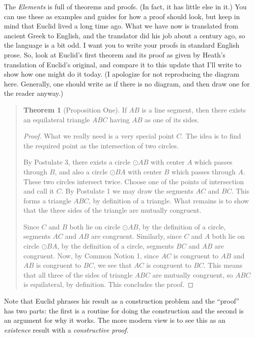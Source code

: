 \documentclass{tufte-handout}
\theoremstyle{definition}
\newtheorem*{theorem}{Theorem}
\begin{document}
The \emph{Elements} is full of theorems and proofs. (In fact, it has little else in it.) You can use these as examples and guides for how a proof should look, but keep in mind that Euclid lived a long time ago. What we have now is translated from ancient Greek to English, and the translator did his job about a century ago, so the language is a bit odd. I want you to write your proofs in standard English prose. So, look at Euclid's first theorem and its proof as given by Heath's translation of Euclid's original, and compare it to this update that I'll write to show how one might do it today. (I apologize for not reproducing the diagram here. Generally, one should write as if there is no diagram, and then draw one for the reader anyway.)
\begin{quotation}
\begin{theorem}[Proposition One] If $AB$ is a line segment, then there exists an equilateral triangle $ABC$ having $AB$ as one of its sides.
\end{theorem}

\begin{proof} What we really need is a very special point $C$. The idea is to find the required point as the intersection of two circles.

By Postulate 3, there exists a circle $\odot AB$ with center $A$ which passes through $B$, and also a circle $\odot BA$ with center $B$ which passes through $A$. These two circles intersect twice. Choose one of the points of intersection and call it $C$. By Postulate 1 we may draw the segments $AC$ and $BC$. This forms a triangle $ABC$, by definition of a triangle. What remains is to show that the three sides of the triangle are mutually congruent.

Since $C$ and $B$ both lie on circle $\odot AB$, by the definition of a circle, segments $AC$ and $AB$ are congruent.
Similarly, since $C$ and $A$ both lie on circle $\odot BA$, by the definition of a circle, segments $BC$ and $AB$ are congruent. Now, by Common Notion 1, since $AC$ is congruent to $AB$ and $AB$ is congruent to $BC$, we see that $AC$ is congruent to $BC$. This means that all three of the sides of triangle $ABC$ are mutually congruent, so $ABC$ is equilateral, by definition. This concludes the proof.
\end{proof}
\end{quotation}
Note that Euclid phrases his result as a construction problem and the ``proof'' has two parts: the first is a routine for doing the construction and the second is an argument for why it works. The more modern view is to see this as an \emph{existence} result with a \emph{constructive proof}.
\end{document}
